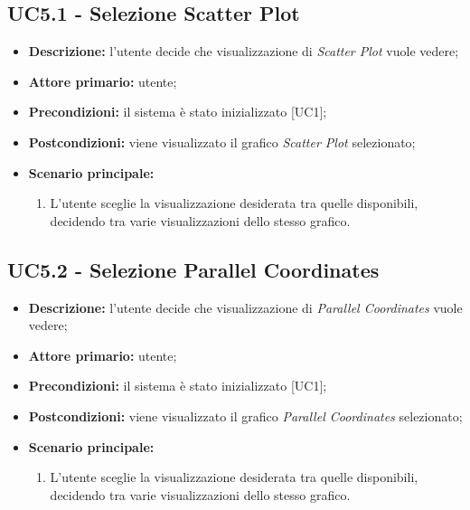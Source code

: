 \subsection{UC5.1 - Selezione Scatter Plot}
\begin{itemize}
    \item \textbf{Descrizione:} l'utente decide che visualizzazione di \textit{Scatter Plot} vuole vedere;
    \item \textbf{Attore primario:} utente;
    \item \textbf{Precondizioni:} il sistema è stato inizializzato [UC1];
    \item \textbf{Postcondizioni:} viene visualizzato il grafico \textit{Scatter Plot} selezionato;
    \item \textbf{Scenario principale:}
    \begin{enumerate}
      \item L'utente sceglie la visualizzazione desiderata tra quelle disponibili, decidendo tra varie visualizzazioni dello stesso grafico.
    \end{enumerate}
\end{itemize}

\subsection{UC5.2 - Selezione Parallel Coordinates}
\begin{itemize}
    \item \textbf{Descrizione:} l'utente decide che visualizzazione di \textit{Parallel Coordinates} vuole vedere;
    \item \textbf{Attore primario:} utente;
    \item \textbf{Precondizioni:} il sistema è stato inizializzato [UC1];
    \item \textbf{Postcondizioni:} viene visualizzato il grafico \textit{Parallel Coordinates} selezionato;
    \item \textbf{Scenario principale:}
    \begin{enumerate}
    \item L'utente sceglie la visualizzazione desiderata tra quelle disponibili, decidendo tra varie visualizzazioni dello stesso grafico.
    \end{enumerate}
\end{itemize}

